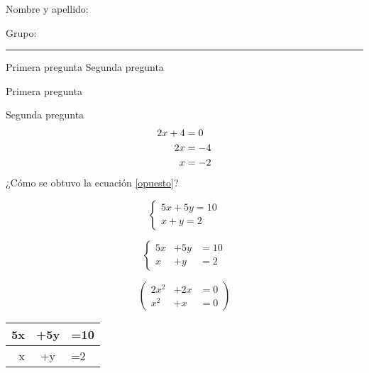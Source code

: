 \documentclass[a4paper,12pt]{exam}
\begin{document}
Nombre y apellido:\hrulefill

Grupo:\rule{2cm}{0.1mm}
\vspace{0.5cm}
\begin{questions}
\question Primera pregunta
\question Segunda pregunta
\end{questions}

\begin{questions}
 
\question Primera pregunta
 
\question Segunda pregunta
	\begin{align}
		2x+4 & =0 \notag \\
		2x & =-4 \label{opuesto}\\
		x & =-2
	\end{align}
	¿Cómo se obtuvo la ecuación \ref{opuesto}?
	
\end{questions}

\[
\left \{
\begin{array}{l}
5x+5y=10\\
x+y=2
\end{array}
\right .
\]

\[
\left \{
\begin{array}{rcl}
5x & +5y & =10\\
x & +y & =2
\end{array}
\right .
\]

\[
\left(
\begin{array}{rcl}
2x^2 & +2x & =0\\
x^2 & +x & =0
\end{array}
\right)
\]

\begin{center}
\begin{tabular}{r|c|l}
5x & +5y & =10 \\
\hline
x & +y & =2
\end{tabular}

\end{center}
\end{document}
